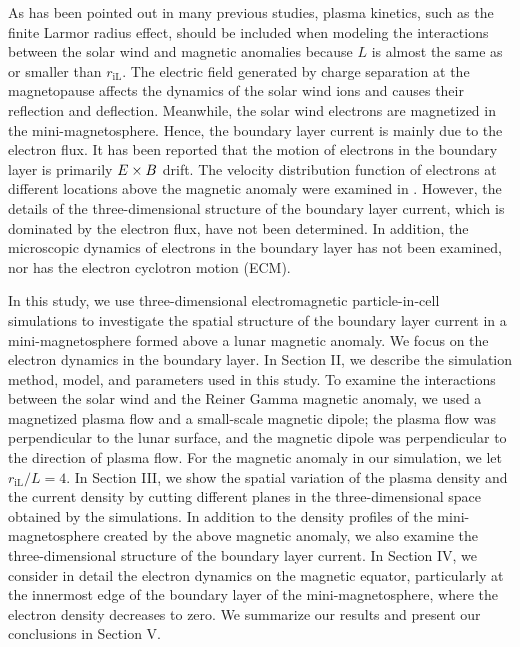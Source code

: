 \documentclass[draft,jgrga]{agutex2015}
\begin{document}
\begin{article}
As has been pointed out in many previous studies,
plasma kinetics, such as the finite Larmor radius effect, should be included when modeling
the interactions between the solar wind and magnetic anomalies
because $L$ is almost the same as or smaller than $r_\mathrm{iL}$.
The electric field generated by
charge separation at the magnetopause affects 
the dynamics of the solar wind ions and 
causes their reflection and deflection. %
Meanwhile, the solar wind electrons are magnetized in the mini-magnetosphere.
Hence, the boundary layer current is mainly due to the electron flux.
It has been reported that the motion of electrons in the boundary layer 
is primarily 
$\mbox{\boldmath $E$} \times \mbox{\boldmath $B$}$ drift.
The velocity distribution function of electrons at different locations above
the magnetic anomaly were examined in \cite{Deca2015}.
However, the details of the three-dimensional structure of the boundary layer current,
which is dominated by the electron flux, have not been determined.
In addition, 
the microscopic dynamics of electrons in the boundary layer has not been
examined, nor has the electron cyclotron motion (ECM).
%

In this study,
we use three-dimensional electromagnetic particle-in-cell simulations to investigate the spatial structure of the boundary layer current 
in a mini-magnetosphere formed above a lunar magnetic anomaly.
We focus on the electron dynamics in the boundary layer.
In Section II, we describe the simulation method, model, and parameters used in this study.
To examine the interactions between the solar wind and the Reiner Gamma magnetic anomaly, we used a magnetized plasma flow and a small-scale magnetic dipole; 
the plasma flow was perpendicular to the lunar surface, and the magnetic dipole was perpendicular to
the direction of plasma flow.
For the magnetic anomaly in our simulation, we let $r_\mathrm{iL} /L=4$.
In Section III, we show the spatial variation of the plasma density and the current density
by cutting different planes in the three-dimensional space obtained by the simulations.
In addition to the density profiles of the mini-magnetosphere created by the above magnetic anomaly, 
we also examine the three-dimensional structure of the boundary layer current.
In Section IV, we consider in detail the electron dynamics on the magnetic equator,
particularly at the innermost edge of the boundary layer of the mini-magnetosphere, 
where the electron density decreases to zero.
We summarize our results and present our conclusions in Section V.



\end{article}
\end{document}
